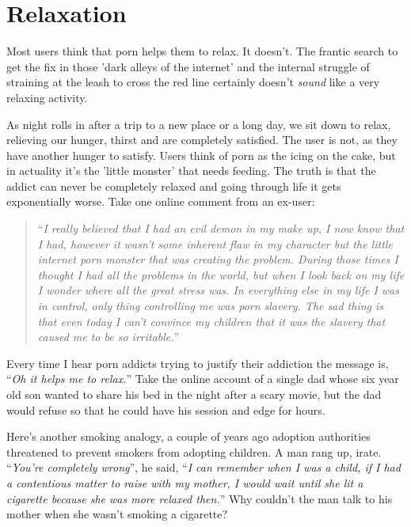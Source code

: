 \documentclass[
]{book}
\begin{document}
\hypertarget{relaxation}{%
\section{Relaxation}\label{relaxation}}

Most users think that porn helps them to relax. It doesn't. The frantic search to get the fix in those 'dark alleys of the internet' and the internal struggle of straining at the leash to cross the red line certainly doesn't \emph{sound} like a very relaxing activity.

As night rolls in after a trip to a new place or a long day, we sit down to relax, relieving our hunger, thirst and are completely satisfied. The user is not, as they have another hunger to satisfy. Users think of porn as the icing on the cake, but in actuality it's the 'little monster' that needs feeding. The truth is that the addict can never be completely relaxed and going through life it gets exponentially worse. Take one online comment from an ex-user:

\begin{quote}
``\emph{I really believed that I had an evil demon in my make up, I now know that I had, however it wasn't some inherent flaw in my character but the little internet porn monster that was creating the problem. During those times I thought I had all the problems in the world, but when I look back on my life I wonder where all the great stress was. In everything else in my life I was in control, only thing controlling me was porn slavery. The sad thing is that even today I can't convince my children that it was the slavery that caused me to be so irritable.}''
\end{quote}

Every time I hear porn addicts trying to justify their addiction the message is, ``\emph{Oh it helps me to relax.}'' Take the online account of a single dad whose six year old son wanted to share his bed in the night after a scary movie, but the dad would refuse so that he could have his session and edge for hours.

Here's another smoking analogy, a couple of years ago adoption authorities threatened to prevent smokers from adopting children. A man rang up, irate. ``\emph{You're completely wrong}'', he said, ``\emph{I can remember when I was a child, if I had a contentious matter to raise with my mother, I would wait until she lit a cigarette because she was more relaxed then.}'' Why couldn't the man talk to his mother when she wasn't smoking a cigarette?
\end{document}
